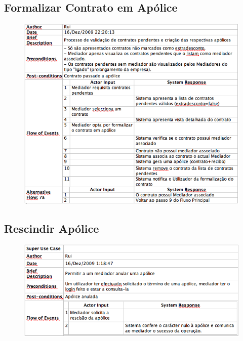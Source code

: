 \pagebreak

\subsection{Formalizar Contrato em Apólice}
\begin{figure}[!htb]
	\centering
	\includegraphics[scale=0.62]{images/Prints/Contratacao/FormalizarContratoApolice.png} 
\end{figure}

\subsection{Rescindir Apólice}
\begin{figure}[!htb]
	\centering
	\includegraphics[scale=0.62]{images/Prints/Contratacao/RescindirApolice.png} 
\end{figure}

\pagebreak



